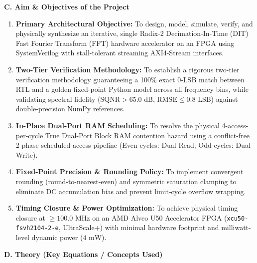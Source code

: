 \documentclass[10pt,a4paper]{article}
\newcommand{\reportsection}[1]{%
  \vspace{3mm}%
  \noindent
  \begin{tcolorbox}[
    colback=tableheaderbg,
    colframe=bordergray,
    arc=1.2mm,
    boxrule=0.8pt,
    left=4mm, right=4mm, top=2.2mm, bottom=2.2mm
  ]
    {\Large\bfseries\color{headerblue}#1}
  \end{tcolorbox}%
  \vspace{1mm}%
}
\begin{document}
\reportsection{C. Aim \& Objectives of the Project}

\begin{enumerate}[label=\bfseries\arabic*., leftmargin=6mm, itemsep=3pt]
    \item \textbf{Primary Architectural Objective:} To design, model, simulate, verify, and physically synthesize an iterative, single Radix-2 Decimation-In-Time (DIT) Fast Fourier Transform (FFT) hardware accelerator on an FPGA using SystemVerilog with stall-tolerant streaming AXI4-Stream interfaces.
    \item \textbf{Two-Tier Verification Methodology:} To establish a rigorous two-tier verification methodology guaranteeing a 100\% exact 0-LSB match between RTL and a golden fixed-point Python model across all frequency bins, while validating spectral fidelity ($\text{SQNR} > 65.0\text{ dB}$, $\text{RMSE} \le 0.8\text{ LSB}$) against double-precision NumPy references.
    \item \textbf{In-Place Dual-Port RAM Scheduling:} To resolve the physical 4-access-per-cycle True Dual-Port Block RAM contention hazard using a conflict-free 2-phase scheduled access pipeline (Even cycles: Dual Read; Odd cycles: Dual Write).
    \item \textbf{Fixed-Point Precision \& Rounding Policy:} To implement convergent rounding (round-to-nearest-even) and symmetric saturation clamping to eliminate DC accumulation bias and prevent limit-cycle overflow wrapping.
    \item \textbf{Timing Closure \& Power Optimization:} To achieve physical timing closure at $\ge 100.0\text{ MHz}$ on an AMD Alveo U50 Accelerator FPGA (\texttt{xcu50-fsvh2104-2-e}, UltraScale+) with minimal hardware footprint and milliwatt-level dynamic power ($4\text{ mW}$).
\end{enumerate}

\reportsection{D. Theory (Key Equations / Concepts Used)}
\end{document}
